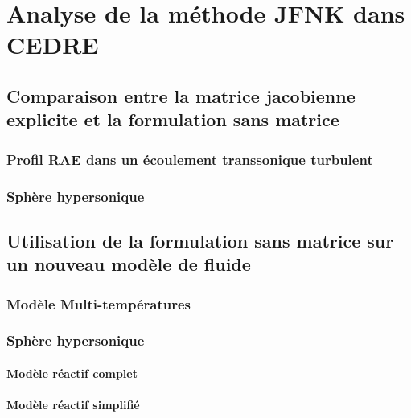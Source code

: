 \chapter{Analyse de la méthode JFNK dans CEDRE}
  \section{Comparaison entre la matrice jacobienne explicite et la formulation sans matrice}
    \subsection{Profil RAE dans un écoulement transsonique turbulent}
    \subsection{Sphère hypersonique}
  \section{Utilisation de la formulation sans matrice sur un nouveau modèle de fluide}
    \subsection{Modèle Multi-températures}
    \subsection{Sphère hypersonique}
      \subsubsection{Modèle réactif complet}
      \subsubsection{Modèle réactif simplifié}
